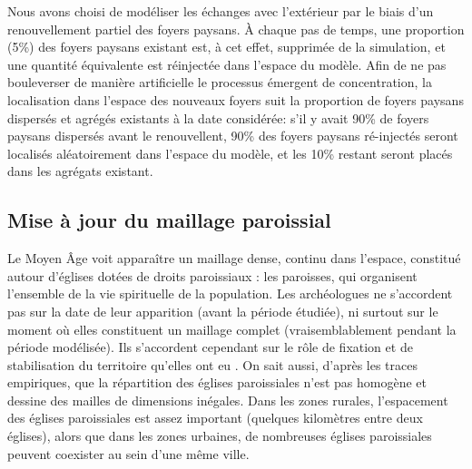 \begin{tcolorbox}[breakable,left=0pt,right=0pt,top=0pt,bottom=0pt,
	colback=gray!15,colframe=gray!15,width=\dimexpr\textwidth\relax, 
	enlarge left by=0mm, boxsep=5pt,arc=0pt,outer arc=0pt]
Nous avons choisi de modéliser les échanges avec l'extérieur par le biais d'un renouvellement partiel des foyers paysans.
À chaque pas de temps, une proportion (5\%) des foyers paysans existant est, à cet effet, supprimée de la simulation, et une quantité équivalente est réinjectée dans l'espace du modèle.
Afin de ne pas bouleverser de manière artificielle le processus émergent de concentration, la localisation dans l'espace des nouveaux foyers suit la proportion de foyers paysans dispersés et agrégés existants à la date considérée:
s'il y avait 90\% de foyers paysans dispersés avant le renouvellent, 90\% des foyers paysans ré-injectés seront localisés aléatoirement dans l'espace du modèle, et les 10\% restant seront placés dans les agrégats existant\footnotemark.
\end{tcolorbox}

\subsection{Mise à jour du maillage paroissial \label{meca-paroisses}}

Le Moyen Âge voit apparaître un maillage dense, continu dans l'espace, constitué autour d'églises dotées de droits paroissiaux : les paroisses, qui organisent l'ensemble de la vie spirituelle de la population.
Les archéologues ne s'accordent pas sur la date de leur apparition (avant la période étudiée), ni surtout sur le moment où elles constituent un maillage complet (vraisemblablement pendant la période modélisée).
Ils s'accordent cependant sur le rôle de fixation et de stabilisation du territoire qu'elles ont eu \autocite{zadora-rio_paroisses_2008}.
On sait aussi, d'après les traces empiriques, que la répartition des églises paroissiales n'est pas homogène et dessine des mailles de dimensions inégales.
Dans les zones rurales, l'espacement des églises paroissiales est assez important (quelques kilomètres entre deux églises), alors que dans les zones urbaines, de nombreuses églises paroissiales peuvent coexister au sein d'une même ville.

